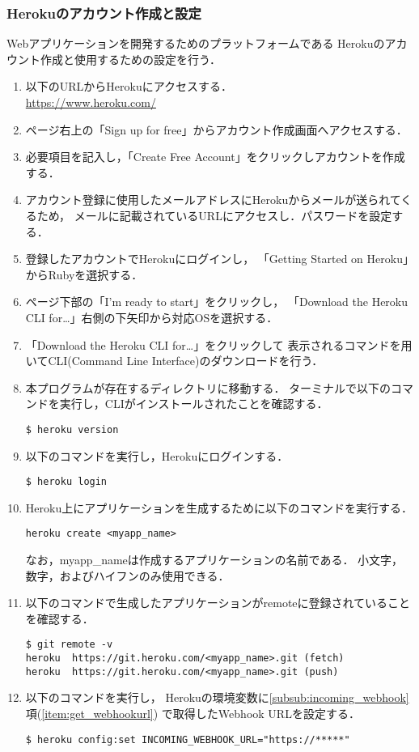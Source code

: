 \documentclass[fleqn, 14pt]{extarticlej}
\begin{document}
\subsubsection{Herokuのアカウント作成と設定}
\label{subsub:heroku}
Webアプリケーションを開発するためのプラットフォームである
Herokuのアカウント作成と使用するための設定を行う．
\begin{enumerate}
\item 以下のURLからHerokuにアクセスする．\\
  \url{https://www.heroku.com/}
\item ページ右上の「Sign up for free」からアカウント作成画面へアクセスする．
\item 必要項目を記入し，「Create Free Account」をクリックしアカウントを作成する．
\item アカウント登録に使用したメールアドレスにHerokuからメールが送られてくるため，
  メールに記載されているURLにアクセスし．パスワードを設定する．
\item 登録したアカウントでHerokuにログインし，
  「Getting Started on Heroku」からRubyを選択する．
\item ページ下部の「I’m ready to start」をクリックし，
  「Download the Heroku CLI for…」右側の下矢印から対応OSを選択する．
\item 「Download the Heroku CLI for…」をクリックして
  表示されるコマンドを用いてCLI(Command Line Interface)のダウンロードを行う．
\item 本プログラムが存在するディレクトリに移動する．
  ターミナルで以下のコマンドを実行し，CLIがインストールされたことを確認する．
\begin{verbatim}
$ heroku version
\end{verbatim}
\item 以下のコマンドを実行し，Herokuにログインする．
\begin{verbatim}
$ heroku login
\end{verbatim}
\item \label{item:make_app}
  Heroku上にアプリケーションを生成するために以下のコマンドを実行する．
\begin{verbatim}
heroku create <myapp_name>
\end{verbatim}
なお，myapp\_nameは作成するアプリケーションの名前である．
小文字，数字，およびハイフンのみ使用できる．
\item 以下のコマンドで生成したアプリケーションがremoteに登録されていることを確認する．
\begin{verbatim}
$ git remote -v
heroku	https://git.heroku.com/<myapp_name>.git (fetch)
heroku	https://git.heroku.com/<myapp_name>.git (push)
\end{verbatim}
\item 以下のコマンドを実行し，
  Herokuの環境変数に\ref{subsub:incoming_webhook}項(\ref{item:get_webhookurl})
  で取得したWebhook URLを設定する．
\begin{verbatim}
$ heroku config:set INCOMING_WEBHOOK_URL="https://*****"
\end{verbatim}
\end{enumerate}
\end{document}
